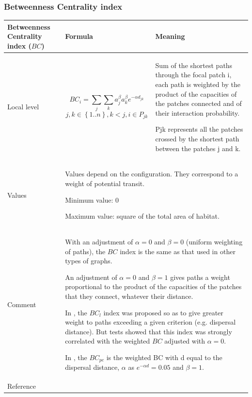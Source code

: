 \documentclass{article}
\begin{document}
\subsubsection{Betweenness Centrality index}
\label{metric_BC}
\begin{table}[H]
\begin{tabular}{|m{3.24cm}|m{4.4810004cm}m{7.924cm}|}
\hline
Betweenness Centrality index
($BC$) &
\multicolumn{1}{m{4.4810004cm}|}{Formula} &
Meaning\\\hline
Local level &
\multicolumn{1}{m{4.4810004cm}|}{\begin{equation*}
{\mathit{BC}}_{i}=\sum _{j}{\sum _{k}{{a}_{j}^{\beta }}}{a}_{k}^{\beta
}{e}^{-\alpha {d}_{\mathit{jk}}}
\end{equation*}
\begin{equation*}
j,k{\in}\left\{1..n\right\},k<j,i{\in}{P}_{\mathit{jk}}
\end{equation*}
} &
Sum of the shortest paths through the focal patch i, each path is
weighted by the product of the capacities of the patches connected and
of their interaction probability.

Pjk represents all the patches crossed by the shortest path between the
patches j and k.

\\\hline
Values &
\multicolumn{2}{m{12.6050005cm}|}{Values depend on the configuration.
They correspond to a weight of potential transit.

Minimum value: 0

Maximum value: square of the total area of habitat.
}\\\hline
Comment &
\multicolumn{2}{m{12.6050005cm}|}{With an adjustment of $\alpha = 0$
and $\beta = 0$ (uniform weighting of paths), the $BC$ index is the same
as that used in other types of graphs. 

An adjustment of $\alpha = 0$ and $\beta = 1$ gives paths a weight
proportional to the product of the capacities of the patches that they
connect, whatever their distance. 

In \cite{2012_graphab_EMS, 2012_SDM}, the $BC_l$ index was proposed so as to
give greater weight to paths exceeding a given criterion (e.g.
dispersal distance). But tests showed that this index was strongly
correlated with the weighted $BC$ adjusted with $\alpha=0$. 

In \cite{Bodin2010}, the  ${\mathit{BC}}_{\mathit{pc}}$ is the
weighted BC with d equal to the dispersal distance,  $\alpha $ as 
${e}^{-\mathit{\alpha d}}=0.05$ and  $\beta =1$.

}\\\hline
Reference &
\multicolumn{2}{m{12.6050005cm}|}{
\cite{Bodin2010}
\cite{2012_graphab_EMS}	
}\\\hline
\end{tabular}
\end{table}
\end{document}
